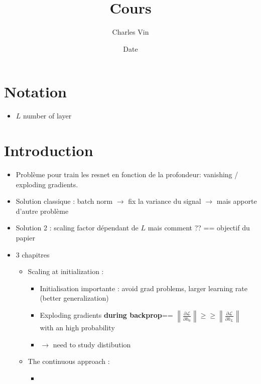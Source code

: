 \documentclass{article}
\title{Cours}
\author{Charles Vin}
\date{Date}
\theoremstyle{plain}%
\theoremstyle{definition}
\theoremstyle{remark}
\begin{document}
\maketitle
\section{Notation}
\begin{itemize}
    \item $ L $ number of layer 
\end{itemize}

\section{Introduction}
\begin{itemize}
    \item Problème pour train les resnet en fonction de la profondeur: vanishing / exploding gradients.
    \item Solution classique : batch norm $\rightarrow$ fix la variance du signal $\rightarrow$ mais apporte d'autre problème
    \item Solution 2 : scaling factor dépendant de $ L $ mais comment ?? == objectif du papier
    \item 3 chapitres \begin{itemize}
        \item Scaling at initialization : \begin{itemize}
            \item Initialisation importante : avoid grad problems, larger learning rate (better generalization)
            \item Exploding gradients \textbf{during backprop}== $ \left\| \frac{\partial \mathcal{L}}{\partial h_0 }  \right\| \geq \geq \left\| \frac{\partial \mathcal{L}}{\partial h_L }  \right\|  $ with an high probability 
            \item $\rightarrow$ need to study distibution
        \end{itemize}
        \item The continuous approach : \begin{itemize}
            \item 
        \end{itemize}
    \end{itemize}
\end{itemize}
\end{document}
